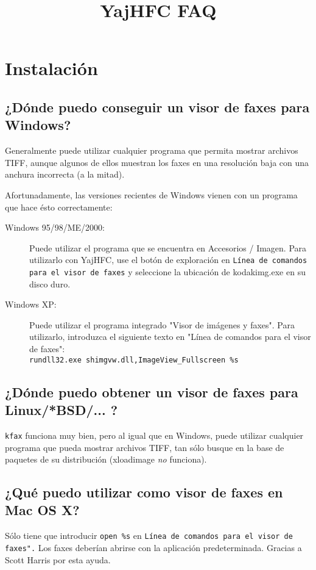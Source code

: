 \documentclass[a4paper,10pt]{scrartcl}
\title{YajHFC FAQ}
\author{}
\date{}
\begin{document}
\sloppy

\maketitle

\tableofcontents

\section{Instalación}
\subsection{¿Dónde puedo conseguir un visor de faxes para Windows?}

Generalmente puede utilizar cualquier programa que permita mostrar archivos TIFF, aunque algunos de ellos muestran los faxes en una resolución baja con una anchura incorrecta (a la mitad).

Afortunadamente, las versiones recientes de Windows vienen con un programa 
que hace ésto correctamente:

\begin{description}
\item[Windows 95/98/ME/2000:]
Puede utilizar el programa que se encuentra en Accesorios / Imagen. 
Para utilizarlo con YajHFC, use el botón de exploración en \texttt{Línea de comandos 
para el visor de faxes} y seleccione la ubicación de kodakimg.exe en su disco duro.

\item[Windows XP:]
Puede utilizar el programa integrado "Visor de imágenes y faxes". 
Para utilizarlo, introduzca el siguiente texto en "Línea de comandos para el visor de faxes":\\
      \verb#rundll32.exe shimgvw.dll,ImageView_Fullscreen %s#
 \end{description}

      
\subsection{¿Dónde puedo obtener un visor de faxes para Linux/*BSD/... ?}
\texttt{kfax} funciona muy bien, pero al igual que en Windows, puede utilizar cualquier programa que pueda mostrar archivos TIFF, tan sólo busque en la base de paquetes de su distribución (xloadimage \emph{no} funciona).


\subsection{¿Qué puedo utilizar como visor de faxes en Mac OS X?}
Sólo tiene que introducir \verb#open %s# en \texttt{Línea de comandos para el visor de faxes".}
Los faxes deberían abrirse con la aplicación predeterminada. 
Gracias a Scott Harris por esta ayuda.
\end{document}
